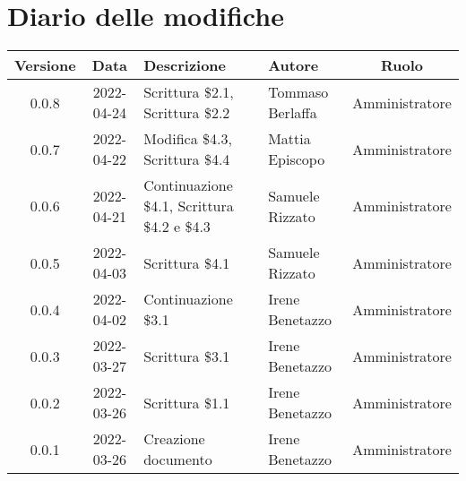 \section*{Diario delle modifiche}
	\begin{center}
	\renewcommand{\arraystretch}{1.8} %
	\begin{tabular}{ |c|c|m{12em}|m{7em}|c| }
	\hline
	\textbf{Versione} & \textbf{Data} & \textbf{Descrizione} &  \textbf{Autore} &  \textbf{Ruolo} \\ %
	\hline
	0.0.8 & 2022-04-24 & Scrittura \$2.1, Scrittura \$2.2 & Tommaso \newline Berlaffa & Amministratore\\
	\hline
	0.0.7 & 2022-04-22 & Modifica \$4.3, Scrittura \$4.4 & Mattia \newline Episcopo & Amministratore\\
	\hline
	0.0.6 & 2022-04-21 & Continuazione \$4.1, Scrittura \$4.2 e \$4.3 & Samuele \newline Rizzato & Amministratore\\ %
	\hline
	0.0.5 & 2022-04-03 & Scrittura \$4.1 & Samuele \newline Rizzato & Amministratore\\
	\hline
	0.0.4 & 2022-04-02 & Continuazione \$3.1 & Irene Benetazzo & Amministratore\\
	\hline
	0.0.3 & 2022-03-27 & Scrittura \$3.1 & Irene Benetazzo & Amministratore\\
	\hline
	0.0.2 & 2022-03-26 & Scrittura \$1.1 & Irene Benetazzo & Amministratore\\
	\hline
    0.0.1 & 2022-03-26 & Creazione documento & Irene Benetazzo & Amministratore\\
	\hline
	\end{tabular}
	\end{center}
	\newpage
